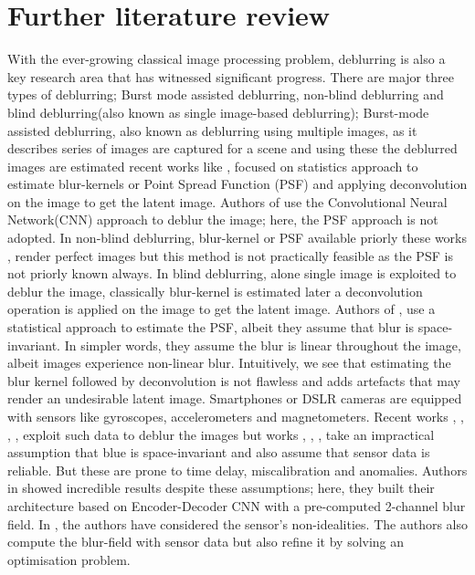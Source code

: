 \documentclass[10pt,twocolumn,letterpaper]{article}
\begin{document}
\section{Further literature review}
With the ever-growing classical image processing problem, deblurring is also a key research area that has witnessed significant progress. There are major three types of deblurring; Burst mode assisted deblurring, non-blind deblurring and blind deblurring(also known as single image-based deblurring);  Burst-mode assisted deblurring, also known as deblurring using multiple images, as it describes series of images are captured for a scene and using these the deblurred images are estimated recent works like \cite{article}, \cite{10.1145/1141911.1141956} focused on statistics approach to estimate blur-kernels or Point Spread Function (PSF) and applying deconvolution on the image to get the latent image. Authors of \cite{Aittala_2018_ECCV} use the Convolutional Neural Network(CNN) approach to deblur the image; here, the PSF approach is not adopted. In non-blind deblurring, blur-kernel or PSF available priorly these works \cite{8578443}, \cite{6618928} render perfect images but this method is not practically feasible as the PSF is not priorly known always. In blind deblurring, alone single image is exploited to deblur the image, classically blur-kernel is estimated later a  deconvolution operation is applied on the image to get the latent image. Authors of \cite{8237771}, \cite{6126276} use a statistical approach to estimate the PSF, albeit they assume that blur is space-invariant. In simpler words, they assume the blur is linear throughout the image, albeit images experience non-linear blur. Intuitively, we see that estimating the blur kernel followed by deconvolution is not flawless and adds artefacts that may render an undesirable latent image. Smartphones or DSLR cameras are equipped with sensors like gyroscopes, accelerometers and magnetometers. Recent works \cite{7780574}, \cite{Sindelar2013ImageDI}, \cite{9444479}, \cite{8820138}, \cite{mustaniemi2018gyroscopeaided} exploit such data to deblur the images but works \cite{Sindelar2013ImageDI}, \cite{9444479}, \cite{8820138}, \cite{mustaniemi2018gyroscopeaided} take an impractical assumption that blue is space-invariant and also assume that sensor data is reliable. But these are prone to time delay, miscalibration and anomalies. Authors in \cite{mustaniemi2018gyroscopeaided} showed incredible results despite these assumptions; here, they built their architecture based on Encoder-Decoder CNN with a pre-computed 2-channel blur field. In \cite{7780574}, the authors have considered the sensor’s non-idealities. The authors also compute the blur-field with sensor data but also refine it by solving an optimisation problem. 
\end{document}
